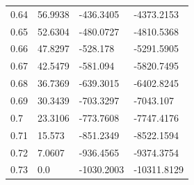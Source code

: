\begin{tabular}{llll}
0.64 & 56.9938 & -436.3405 & -4373.2153 \\
0.65 & 52.6304 & -480.0727 & -4810.5368 \\
0.66 & 47.8297 & -528.178 & -5291.5905 \\
0.67 & 42.5479 & -581.094 & -5820.7495 \\
0.68 & 36.7369 & -639.3015 & -6402.8245 \\
0.69 & 30.3439 & -703.3297 & -7043.107 \\
0.7 & 23.3106 & -773.7608 & -7747.4176 \\
0.71 & 15.573 & -851.2349 & -8522.1594 \\
0.72 & 7.0607 & -936.4565 & -9374.3754 \\
0.73 & 0.0 & -1030.2003 & -10311.8129 \\
\bottomrule
\end{tabular}
